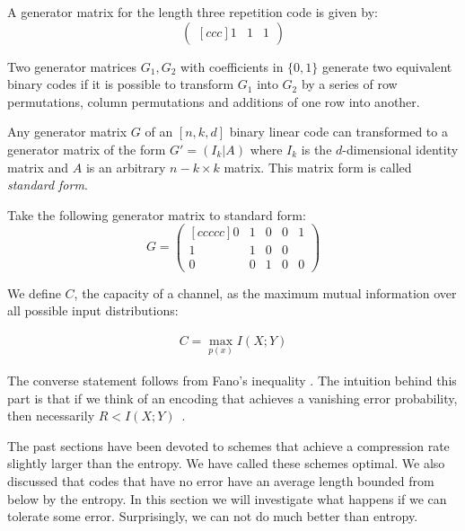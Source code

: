 \begin{example}
A generator matrix for the length three repetition code is given by:
\begin{equation}
\begin{pmatrix}[ccc]
1 & 1 & 1
\end{pmatrix}
\end{equation}
\end{example}
\begin{exercise}
Two generator matrices $G_1,G_2$ with coefficients in $\{0,1\}$ generate two equivalent binary codes if it is possible to transform $G_1$ into $G_2$ by a series of row permutations, column permutations and additions of one row into another.
\end{exercise}
\begin{lemma}
Any generator matrix $G$ of an $[n,k,d]$ binary linear code can transformed to a generator matrix of the form $G'=\left(I_k|A\right)$ where $I_k$ is the $d$-dimensional identity matrix and $A$ is an arbitrary $n-k\times k$ matrix. This matrix form is called \textit{standard form}.
\end{lemma}
\begin{exercise}
Take the following generator matrix to standard form:
\begin{equation}
G=\begin{pmatrix}[ccccc]
0 & 1 &0 &0 &1\\
1 & 1& 0 & 0 &\\
0 & 0 & 1  &0 & 0
\end{pmatrix}
\end{equation}
\end{exercise}
We define $C$, the capacity of a channel, as the maximum mutual information over all possible input distributions: 

\begin{eqnarray}
\label{eq:capform}
C = \max_{p(x)} I(X;Y)
\end{eqnarray}

The converse statement follows from Fano's inequality \cite{Fano_61}. The intuition behind this part is that if we think of an encoding that achieves a vanishing error probability, then necessarily $R<I(X;Y)$~\cite{Cover_91}. 

The past sections have been devoted to schemes that achieve a compression rate slightly larger than the entropy. We have called these schemes optimal. We also discussed that codes that have no error have an average length bounded from below by the entropy. In this section we will investigate what happens if we can tolerate some error. Surprisingly, we can not do much better than entropy. 

